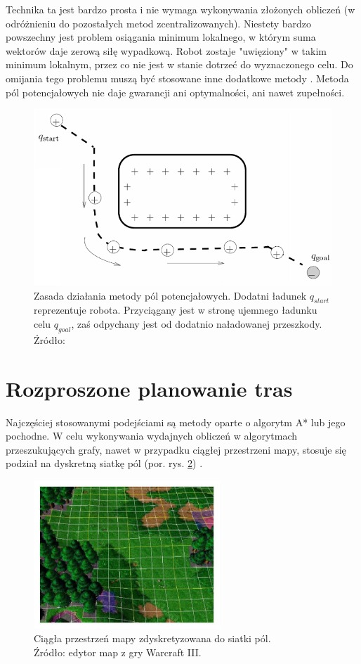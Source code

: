 Technika ta jest bardzo prosta i nie wymaga wykonywania złożonych obliczeń (w odróżnieniu do pozostałych metod zcentralizowanych).
Niestety bardzo powszechny jest problem osiągania minimum lokalnego, w którym suma wektorów daje zerową siłę wypadkową. Robot zostaje "uwięziony" w takim minimum lokalnym, przez co nie jest w stanie dotrzeć do wyznaczonego celu. Do omijania tego problemu muszą być stosowane inne dodatkowe metody \cite{potentialfield}.
Metoda pól potencjałowych nie daje gwarancji ani optymalności, ani nawet zupełności.
\begin{figure}
	\centering
	\includegraphics[width=12cm]{img/potential-field}
	\caption{Zasada działania metody pól potencjałowych. Dodatni ładunek $q_{start}$ reprezentuje robota. Przyciągany jest w stronę ujemnego ładunku celu $q_{goal}$, zaś odpychany jest od dodatnio naładowanej przeszkody. Źródło: \cite{howie_potentialfield}}
	\label{fig:image_potentialfield}
\end{figure}

\section{Rozproszone planowanie tras}
Najczęściej stosowanymi podejściami są metody oparte o algorytm A* lub jego pochodne.
W celu wykonywania wydajnych obliczeń w algorytmach przeszukujących grafy, nawet w przypadku ciągłej przestrzeni mapy, stosuje się podział na dyskretną siatkę pól (por. rys. \ref{fig:img_games_warcraft-map-editor}) \cite{hierpathfindinginrts}.

\begin{figure}[H]
	\centering
	\includegraphics[width=7cm]{img/games/warcraft-map-editor}
	\caption{Ciągła przestrzeń mapy zdyskretyzowana do siatki pól. \\ Źródło: edytor map z gry Warcraft III.}
	\label{fig:img_games_warcraft-map-editor}
\end{figure}

